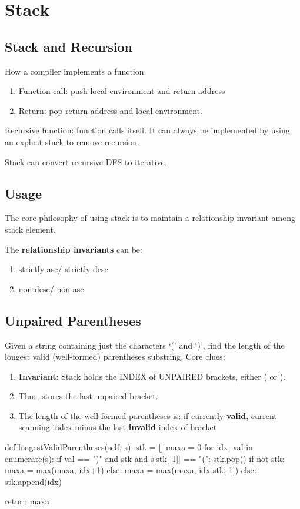 \section{Stack}
\subsection{Stack and Recursion}
How a compiler implements a function:
\begin{enumerate}
\item Function call: push local environment and return address
\item Return: pop return address and local environment. 
\end{enumerate}

Recursive function: function calls itself. It can always be implemented by using an explicit stack to remove recursion. 

Stack can convert recursive DFS to iterative. 

\subsection{Usage}
The core philosophy of using stack is to maintain a relationship invariant among stack element. 

The \textbf{relationship invariants} can be:
\begin{enumerate}
\item strictly asc/ strictly desc
\item non-desc/ non-asc
\end{enumerate}

\subsection{Unpaired Parentheses}
Given a string containing just the characters `(' and `)', find the length of the longest valid (well-formed) parentheses substring. Core clues:
\begin{enumerate}
\item \textbf{Invariant}: Stack holds the INDEX of UNPAIRED brackets, either ( or ).
\item Thus,  stores the last unpaired bracket. 
\item The length of the well-formed parentheses is: if currently \textbf{valid}, current scanning index  minus the last \textbf{invalid} index of bracket 
\end{enumerate}
\begin{python}
def longestValidParentheses(self, s):
  stk = []
  maxa = 0
  for idx, val in enumerate(s):
    if val == ")" and stk and s[stk[-1]] == "(":
      stk.pop()
      if not stk:
        maxa = max(maxa, idx+1)
      else:
        maxa = max(maxa, idx-stk[-1])
    else:
      stk.append(idx)

  return maxa

\end{python}

